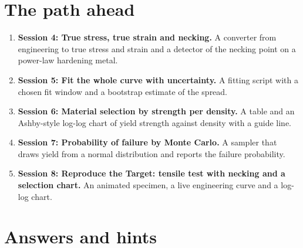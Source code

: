 \documentclass[11pt,a4paper]{article}
\begin{document}
\section{The path ahead}
\begin{enumerate}[nosep]
\item \textbf{Session 4: True stress, true strain and necking.} A converter from engineering to true stress and strain and a detector of the necking point on a power-law hardening metal.
\item \textbf{Session 5: Fit the whole curve with uncertainty.} A fitting script with a chosen fit window and a bootstrap estimate of the spread.
\item \textbf{Session 6: Material selection by strength per density.} A table and an Ashby-style log-log chart of yield strength against density with a guide line.
\item \textbf{Session 7: Probability of failure by Monte Carlo.} A sampler that draws yield from a normal distribution and reports the failure probability.
\item \textbf{Session 8: Reproduce the Target: tensile test with necking and a selection chart.} An animated specimen, a live engineering curve and a log-log chart.
\end{enumerate}

\section{Answers and hints}
\end{document}
